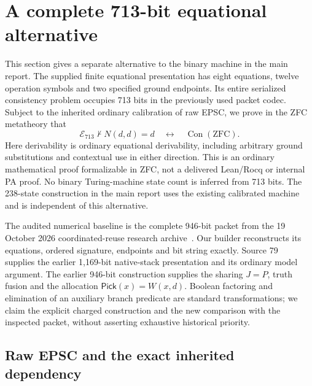 \section{A complete 713-bit equational alternative}
\label{sec:e713}

This section gives a separate alternative to the binary machine in the main
report.  The supplied finite equational presentation has eight equations,
twelve operation symbols and two specified ground endpoints. Its entire
serialized consistency problem occupies 713 bits in the previously used
packet codec. Subject to the inherited ordinary calibration of raw EPSC,
we prove in the ZFC metatheory that
\begin{equation}
 \mathcal E_{713}\not\vdash N(d,d)=d
 \quad\longleftrightarrow\quad \operatorname{Con}(\mathrm{ZFC}).
 \label{eq:e713-calibration}
\end{equation}
Here derivability is ordinary equational derivability, including arbitrary
ground substitutions and contextual use in either direction. This is an
ordinary mathematical proof formalizable in ZFC, not a delivered Lean/Rocq
or internal PA proof. No binary Turing-machine state count is inferred from
713 bits. The 238-state construction in the main report uses the existing
calibrated machine and is independent of this alternative.

The audited numerical baseline is the complete 946-bit packet from the
19 October 2026 coordinated-reuse research archive~\cite{coordinated239}. Our builder reconstructs its
equations, ordered signature, endpoints and bit string exactly. Source 79~\cite{source79}
supplies the earlier 1,169-bit native-stack presentation and its ordinary
model argument. The earlier 946-bit construction supplies the sharing
$J=P$, truth fusion and the allocation $\mathsf{Pick}(x)=W(x,d)$.
Boolean factoring and elimination of an auxiliary branch predicate are
standard transformations; we claim the explicit charged construction and
the new comparison with the inspected packet, without asserting exhaustive
historical priority.

\subsection{Raw EPSC and the exact inherited dependency}

